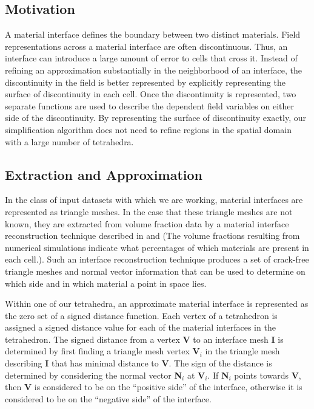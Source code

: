 \documentclass{siggraph}
\begin{document}
\subsection{Motivation}

A material interface defines the boundary between two distinct
materials.  Field representations across a material interface are often
discontinuous.  Thus, an interface can introduce a large amount of
error to cells that cross it.  Instead of refining an approximation
substantially in the neighborhood of an interface, the discontinuity
in the field is better represented by explicitly representing the
surface of discontinuity in each cell.  Once the discontinuity is
represented, two separate functions are used to describe the dependent
field variables on either side of the discontinuity.  By representing
the surface of discontinuity exactly, our simplification algorithm
does not need to refine regions in the spatial domain with a large
number of tetrahedra.


\subsection{Extraction and Approximation}

In the class of input datasets with which we are working, material
interfaces are represented as triangle meshes.
In the case that these triangle meshes are not known, they are
extracted from volume fraction data by a material interface
reconstruction technique described in \cite{Bonnell:2000:OMB} and
\cite{Bonnell:2000:CMI} (The volume fractions resulting from
numerical simulations indicate what percentages of which materials are
present in each cell.).  Such an interface reconstruction technique
produces a set of crack-free triangle meshes and normal vector
information that can be used to determine on which side and in which
material a point in space lies.

Within one of our tetrahedra, an approximate material interface is
represented as the zero set of a signed distance function.  
Each vertex of a tetrahedron is assigned a signed distance value for
each of the material interfaces in the tetrahedron.  The signed
distance from a vertex {\bf{V}} to an interface mesh {\bf{I}} is
determined by first finding a triangle mesh vertex {\bf{V$_{i}$}} in
the triangle mesh describing {\bf{I}} that has minimal distance to
{\bf{V}}.  The sign of the distance is determined by considering the
normal vector {\bf{N$_{i}$}} at {\bf{V$_{i}$}}.  If {\bf{N$_{i}$}}
points towards {\bf{V}}, then {\bf{V}} is considered to be on the
``positive side'' of the interface, otherwise it is considered to be
on the ``negative side'' of the interface.
  
\end{document}
